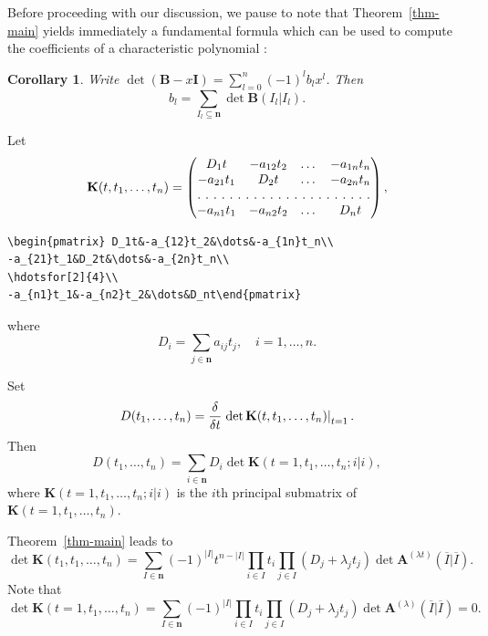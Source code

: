 \documentclass{article}
\newtheorem{cor}[thm]{Corollary}
\theoremstyle{definition}
\theoremstyle{remark}
\newcommand{\thmref}[1]{Theorem~\ref{#1}}
\newcommand{\eval}[2][\right]{\relax
  \ifx#1\right\relax \left.\fi#2#1\rvert}
\newcommand{\envert}[1]{\left\lvert#1\right\rvert}
\begin{document}
Before proceeding with our discussion, we pause to note that
\thmref{thm-main} yields immediately a fundamental formula which can be
used to compute the coefficients of a characteristic polynomial
\cite{mami:matrixth}:
\begin{cor}\label{BI}
Write $\det(\mathbf{B}-x\mathbf{I})=\sum^n_{l =0}(-1)
^l b_l x^l $. Then
\begin{equation}\label{bl-sum}
b_l =\sum_{I_l \subseteq\mathbf{n}}\det\mathbf{B}(I_l |I_l ).
\end{equation}
\end{cor}
Let
\begin{equation}
\mathbf{K}(t,t_1,\dots,t_n)
=\begin{pmatrix} D_1t&-a_{12}t_2&\dots&-a_{1n}t_n\\
-a_{21}t_1&D_2t&\dots&-a_{2n}t_n\\
\hdotsfor[2]{4}\\
-a_{n1}t_1&-a_{n2}t_2&\dots&D_nt\end{pmatrix},
\end{equation}
\begin{verbatim}
\begin{pmatrix} D_1t&-a_{12}t_2&\dots&-a_{1n}t_n\\
-a_{21}t_1&D_2t&\dots&-a_{2n}t_n\\
\hdotsfor[2]{4}\\
-a_{n1}t_1&-a_{n2}t_2&\dots&D_nt\end{pmatrix}
\end{verbatim}
where
\begin{equation}
D_i=\sum_{j\in\mathbf{n}}a_{ij}t_j,\quad i=1,\dots,n.
\end{equation}

Set
\begin{equation*}
D(t_1,\dots,t_n)=\frac{\delta}{\delta t}\eval{\det\mathbf{K}(t,t_1,\dots,t_n)
}_{t=1}.
\end{equation*}
Then
\begin{equation}\label{sum-Di}
D(t_1,\dots,t_n)
=\sum_{i\in\mathbf{n}}D_i\det\mathbf{K}(t=1,t_1,\dots,t_n; i|i),
\end{equation}
where $\mathbf{K}(t=1,t_1,\dots,t_n; i|i)$ is the $i$th principal
submatrix of $\mathbf{K}(t=1,t_1,\dots,t_n)$.

Theorem~\ref{thm-main} leads to
\begin{equation}\label{detK1}
\det\mathbf{K}(t_1,t_1,\dots,t_n)
=\sum_{I\in\mathbf{n}}(-1)^{\envert{I}}t^{n-\envert{I}}
\prod_{i\in I}t_i\prod_{j\in I}(D_j+\lambda_jt_j)\det\mathbf{A}
^{(\lambda t)}(\overline{I}|\overline I).
\end{equation}
Note that
\begin{equation}\label{detK2}
\det\mathbf{K}(t=1,t_1,\dots,t_n)=\sum_{I\in\mathbf{n}}(-1)^{\envert{I}}
\prod_{i\in I}t_i\prod_{j\in I}(D_j+\lambda_jt_j)\det\mathbf{A}
^{(\lambda)}(\overline{I}|\overline{I})=0.
\end{equation}
\end{document}

